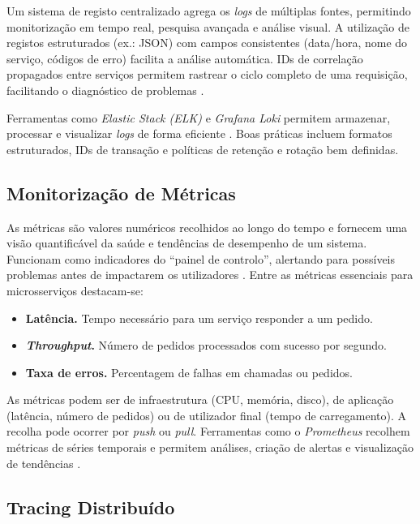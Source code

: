 Um sistema de registo centralizado agrega os \textit{logs} de múltiplas fontes, permitindo monitorização em tempo real, pesquisa avançada e análise visual. A utilização de registos estruturados (ex.: JSON) com campos consistentes (data/hora, nome do serviço, códigos de erro) facilita a análise automática. IDs de correlação propagados entre serviços permitem rastrear o ciclo completo de uma requisição, facilitando o diagnóstico de problemas \cite{Fu2012}.

Ferramentas como \textit{Elastic Stack (ELK)} e \textit{Grafana Loki} permitem armazenar, processar e visualizar \textit{logs} de forma eficiente \cite{Bajer2017}. Boas práticas incluem formatos estruturados, IDs de transação e políticas de retenção e rotação bem definidas.

\subsection{Monitorização de Métricas}

As métricas são valores numéricos recolhidos ao longo do tempo e fornecem uma visão quantificável da saúde e tendências de desempenho de um sistema. Funcionam como indicadores do “painel de controlo”, alertando para possíveis problemas antes de impactarem os utilizadores \cite{Burns2015}. Entre as métricas essenciais para microsserviços destacam-se:

\begin{itemize}
    \item \textbf{Latência.} Tempo necessário para um serviço responder a um pedido.
    \item \textbf{\textit{Throughput}.} Número de pedidos processados com sucesso por segundo.
    \item \textbf{Taxa de erros.} Percentagem de falhas em chamadas ou pedidos.
\end{itemize}

As métricas podem ser de infraestrutura (CPU, memória, disco), de aplicação (latência, número de pedidos) ou de utilizador final (tempo de carregamento). A recolha pode ocorrer por \textit{push} ou \textit{pull}. Ferramentas como o \textit{Prometheus} recolhem métricas de séries temporais e permitem análises, criação de alertas e visualização de tendências \cite{Burns2015}.


\subsection{Tracing Distribuído}

